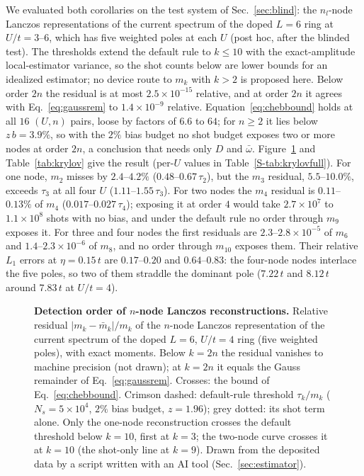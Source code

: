 \documentclass[aps,prb,reprint,onecolumn,12pt,superscriptaddress,longbibliography,floatfix]{revtex4-2}
\newcommand{\colfig}{\setlength{\columnwidth}{0.62\textwidth}}%
\newcommand{\colfig}{}
\begin{document}
We evaluated both corollaries on the test system of Sec.~\ref{sec:blind}: the $n_l$-node Lanczos representations of the current spectrum of the doped $L=6$ ring at $U/t=3$--$6$, which has five weighted poles at each $U$ (post hoc, after the blinded test). The thresholds extend the default rule to $k\le10$ with the exact-amplitude local-estimator variance, so the shot counts below are lower bounds for an idealized estimator; no device route to $m_k$ with $k>2$ is proposed here. Below order $2n$ the residual is at most $2.5\times10^{-15}$ relative, and at order $2n$ it agrees with Eq.~\eqref{eq:gaussrem} to $1.4\times10^{-9}$ relative. Equation~\eqref{eq:chebbound} holds at all $16$ $(U,n)$ pairs, loose by factors of $6.6$ to $64$; for $n\ge2$ it lies below $z\,b=3.9\%$, so with the $2\%$ bias budget no shot budget exposes two or more nodes at order $2n$, a conclusion that needs only $D$ and $\bar\omega$. Figure~\ref{fig:krylov} and Table~\ref{tab:krylov} give the result (per-$U$ values in Table~\ref{S-tab:krylovfull}). For one node, $m_2$ misses by $2.4$--$4.2\%$ ($0.48$--$0.67\,\tau_2$), but the $m_3$ residual, $5.5$--$10.0\%$, exceeds $\tau_3$ at all four $U$ ($1.11$--$1.55\,\tau_3$). For two nodes the $m_4$ residual is $0.11$--$0.13\%$ of $m_4$ ($0.017$--$0.027\,\tau_4$); exposing it at order $4$ would take $2.7\times10^7$ to $1.1\times10^8$ shots with no bias, and under the default rule no order through $m_9$ exposes it. For three and four nodes the first residuals are $2.3$--$2.8\times10^{-5}$ of $m_6$ and $1.4$--$2.3\times10^{-6}$ of $m_8$, and no order through $m_{10}$ exposes them. Their relative $L_1$ errors at $\eta=0.15\,t$ are $0.17$--$0.20$ and $0.64$--$0.83$: the four-node nodes interlace the five poles, so two of them straddle the dominant pole ($7.22\,t$ and $8.12\,t$ around $7.83\,t$ at $U/t=4$).

\begin{figure}[t]
\centering\colfig
{}
\caption{\textbf{Detection order of $n$-node Lanczos reconstructions.} Relative residual $|m_k-\bar m_k|/m_k$ of the $n$-node Lanczos representation of the current spectrum of the doped $L=6$, $U/t=4$ ring (five weighted poles), with exact moments. Below $k=2n$ the residual vanishes to machine precision (not drawn); at $k=2n$ it equals the Gauss remainder of Eq.~\eqref{eq:gaussrem}. Crosses: the bound of Eq.~\eqref{eq:chebbound}. Crimson dashed: default-rule threshold $\tau_k/m_k$ ($N_s=5\times10^4$, $2\%$ bias budget, $z=1.96$); grey dotted: its shot term alone. Only the one-node reconstruction crosses the default threshold below $k=10$, first at $k=3$; the two-node curve crosses it at $k=10$ (the shot-only line at $k=9$). Drawn from the deposited data by a script written with an AI tool (Sec.~\ref{sec:estimator}).}
\label{fig:krylov}
\end{figure}
\end{document}
